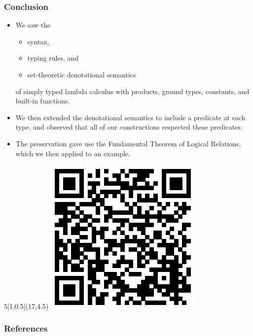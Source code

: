 \documentclass[aspectratio=169]{beamer}
\begin{document}
\begin{frame}
\frametitle{Conclusion}


\begin{itemize}
    \pause
    \item We saw the
    \begin{itemize}
        \item syntax,
        \item typing rules, and
        \item set-theoretic denotational semantics
    \end{itemize}
     of simply typed lambda calculus with products, ground types, constants, and built-in functions.
    \pause
    \item We then extended the denotational semantics to include a predicate at each type, and observed that all of our constructions respected these predicates.
    \pause
    \item The preservation gave use the Fundamental Theorem of Logical Relations, which we then applied to an example.
\end{itemize}

\begin{textblock}{5}[1,0.5](17,4.5)
    \centering
    \vskip4pt
    \pause
    \includegraphics[scale=0.7]{qr-code.eps}
\end{textblock}

\end{frame}

\appendix

\begin{frame}
\frametitle{References}

\printbibliography
\end{frame}
\end{document}
